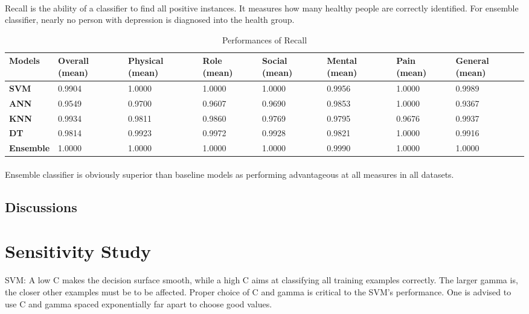 \documentclass[runningheads]{llncs}
\begin{document}
\paragraph{}
Recall is the ability of a classifier to find all positive instances. It measures how many healthy people are correctly identified. For ensemble classifier, nearly no person with depression is diagnosed into the health group.
\begin{table}[h]
\begin{tabular}{|C{2cm}|C{1.5cm}|C{1.5cm}|C{1.5cm}|C{1.5cm}|C{1.5cm}|C{1.5cm}|C{1.5cm}|}
\hline
{} 
{\color[HTML]{333333} \textbf{Models}} & {\color[HTML]{333333} \textbf{Overall (mean)}} & {\color[HTML]{333333} \textbf{Physical (mean)}} & {\color[HTML]{333333} \textbf{Role (mean)}} &{\color[HTML]{333333} \textbf{Social (mean)}} & {\color[HTML]{333333} \textbf{Mental (mean)}} & {\color[HTML]{333333} \textbf{Pain (mean)}} & {\color[HTML]{333333} \textbf{General (mean)}} \\ \hline
{} 
\textbf{SVM} & 0.9904 & 1.0000  & 1.0000  & 1.0000  & 0.9956   & 1.0000   & 0.9989    \\ \hline
{} 
\textbf{ANN}   & 0.9549 & 0.9700  & 0.9607  & 0.9690  & 0.9853  & 1.0000  & 0.9367     \\ \hline
{} 
\textbf{KNN}  & 0.9934 & 0.9811  & 0.9860  & 0.9769 & 0.9795 & 0.9676  & 0.9937       \\ \hline
{} 
\textbf{DT}  & 0.9814  & 0.9923  & 0.9972  & 0.9928 & 0.9821  & 1.0000  & 0.9916     \\ \hline
{} 
\textbf{Ensemble}   & 1.0000 & 1.0000 & 1.0000  & 1.0000  & 0.9990  & 1.0000 & 1.0000   \\ \hline
\end{tabular}
\caption{Performances of Recall}
\label{Recall}
\end{table}
%
%
%
\paragraph{}
Ensemble classifier is obviously superior than baseline models as performing advantageous at all measures
in all datasets. 
%
%
%
%
%
%
%
%
\subsection{Discussions}
%
%
%
%
%
%
%
%
%
%
%
%
%
%
%
%
%
%
%
%
%
\pagebreak
\section{Sensitivity Study}
%
%
%
SVM: 
A low C makes the decision surface smooth, while a high C aims at classifying all training examples correctly.
The larger gamma is, the closer other examples must be to be affected.
Proper choice of C and gamma is critical to the SVM’s performance. One is advised to use C and gamma spaced exponentially far apart to choose good values.
\end{document}
